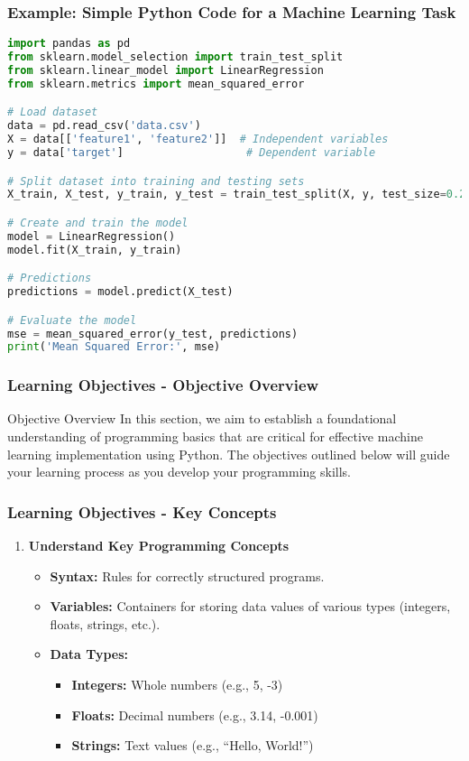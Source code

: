 \documentclass{beamer}
\begin{document}
\begin{frame}[fragile]
    \frametitle{Example: Simple Python Code for a Machine Learning Task}
    \begin{lstlisting}[language=Python]
import pandas as pd
from sklearn.model_selection import train_test_split
from sklearn.linear_model import LinearRegression
from sklearn.metrics import mean_squared_error

# Load dataset
data = pd.read_csv('data.csv')
X = data[['feature1', 'feature2']]  # Independent variables
y = data['target']                   # Dependent variable

# Split dataset into training and testing sets
X_train, X_test, y_train, y_test = train_test_split(X, y, test_size=0.2, random_state=42)

# Create and train the model
model = LinearRegression()
model.fit(X_train, y_train)

# Predictions
predictions = model.predict(X_test)

# Evaluate the model
mse = mean_squared_error(y_test, predictions)
print('Mean Squared Error:', mse)
    \end{lstlisting}
\end{frame}

\begin{frame}[fragile]
    \frametitle{Learning Objectives - Objective Overview}
    \begin{block}{Objective Overview}
        In this section, we aim to establish a foundational understanding of programming basics that are critical for effective machine learning implementation using Python. The objectives outlined below will guide your learning process as you develop your programming skills.
    \end{block}
\end{frame}

\begin{frame}[fragile]
    \frametitle{Learning Objectives - Key Concepts}
    \begin{enumerate}
        \item \textbf{Understand Key Programming Concepts}
        \begin{itemize}
            \item \textbf{Syntax:} Rules for correctly structured programs.
            \item \textbf{Variables:} Containers for storing data values of various types (integers, floats, strings, etc.).
            \item \textbf{Data Types:} 
            \begin{itemize}
                \item \textbf{Integers:} Whole numbers (e.g., 5, -3)
                \item \textbf{Floats:} Decimal numbers (e.g., 3.14, -0.001)
                \item \textbf{Strings:} Text values (e.g., ``Hello, World!'')
            \end{itemize}
        \end{itemize}
    \end{enumerate}
\end{frame}
\end{document}
